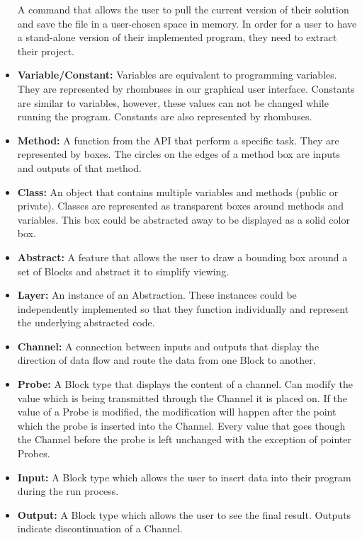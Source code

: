 \documentclass[journal,10pt,onecolumn,compsoc]{IEEEtran} \usepackage[margin=1.0in]{geometry} \usepackage{pdfpages} \usepackage{graphicx}
\begin{document}
\begin{itemize}
		A command that allows the user to pull the current version of their solution and save the file in a user-chosen space in memory.
		In order for a user to have a stand-alone version of their implemented program, they need to extract their project.\\
	\item \textbf{Variable/Constant:}
		Variables are equivalent to programming variables. They are represented by rhombuses in our graphical user interface.
		Constants are similar to  variables, however, these values can not be changed while running the program.
		Constants are also represented by rhombuses.\\
	\item \textbf{Method:}
		A function from the API that perform a specific task. They are represented by boxes.
		The circles on the edges of a method box are inputs and outputs of that method.\\
	\item \textbf{Class:} 
		An object that contains multiple variables and methods (public or private).
		Classes are represented as transparent boxes around methods and variables. This box could be abstracted away to be displayed as a solid color box.\\
	\item \textbf{Abstract:}
		A feature that allows the user to draw a bounding box around a set of Blocks and abstract it to simplify viewing.\\
	\item \textbf{Layer:} 
		An instance of an Abstraction. 
		These instances could be independently implemented so that they function individually and represent the underlying abstracted code.\\
	\item \textbf{Channel:}
		 A connection between inputs and outputs that display the direction of data flow and route the data from one Block to another.\\
	\item \textbf{Probe:}
		A Block type that displays the content of a channel.
		Can modify the value which is being transmitted through the Channel it is placed on.
		If the value of a Probe is modified, the modification will happen after the point which the probe is inserted into the Channel.
		Every value that goes though the Channel before the probe is left unchanged with the exception of pointer Probes.\\
	\item \textbf{Input:}
		A Block type which allows the user to insert data into their program during the run process.\\
	\item \textbf{Output:}
		A Block type which allows the user to see the final result. Outputs indicate discontinuation of a Channel.\\
\end{itemize}
\end{document}
